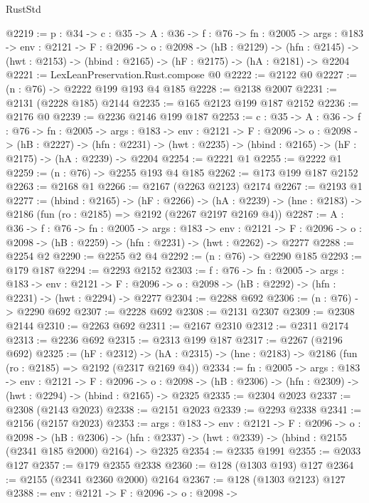 \begin{lexlean}{RustStd}
\begin{coremodule}
{\begin{coremodule}
{{{{@2219 := {p : @34} ->
  {c : @35} ->
  {A : @36} ->
  {f : @76} ->
  {fn : @2005} ->
  {args : @183} ->
  {env : @2121} ->
  {F : @2096} ->
  {o : @2098} ->
  (hB : @2129) ->
  (hfn : @2145) -> (hwt : @2153) -> (hbind : @2165) -> (hF : @2175) -> (hA : @2181) -> @2204
@2221 := LexLeanPreservation.Rust.compose @0
@2222 := @2122 @0
@2227 := (n : @76) -> @2222 @199 @193 @4 @185
@2228 := @2138 @2007
@2231 := @2131 (@2228 @185) @2144
@2235 := @165 @2123 @199 @187 @2152
@2236 := @2176 @0
@2239 := @2236 @2146 @199 @187
@2253 := {c : @35} ->
  {A : @36} ->
  {f : @76} ->
  {fn : @2005} ->
  {args : @183} ->
  {env : @2121} ->
  {F : @2096} ->
  {o : @2098} ->
  (hB : @2227) ->
  (hfn : @2231) -> (hwt : @2235) -> (hbind : @2165) -> (hF : @2175) -> (hA : @2239) -> @2204
@2254 := @2221 @1
@2255 := @2222 @1
@2259 := (n : @76) -> @2255 @193 @4 @185
@2262 := @173 @199 @187 @2152
@2263 := @2168 @1
@2266 := @2167 (@2263 @2123) @2174
@2267 := @2193 @1
@2277 := (hbind : @2165) ->
  (hF : @2266) ->
  (hA : @2239) -> (hne : @2183) -> @2186 (fun (ro : @2185) => @2192 (@2267 @2197 @2169 @4))
@2287 := {A : @36} ->
  {f : @76} ->
  {fn : @2005} ->
  {args : @183} ->
  {env : @2121} ->
  {F : @2096} -> {o : @2098} -> (hB : @2259) -> (hfn : @2231) -> (hwt : @2262) -> @2277
@2288 := @2254 @2
@2290 := @2255 @2 @4
@2292 := (n : @76) -> @2290 @185
@2293 := @179 @187
@2294 := @2293 @2152
@2303 := {f : @76} ->
  {fn : @2005} ->
  {args : @183} ->
  {env : @2121} ->
  {F : @2096} -> {o : @2098} -> (hB : @2292) -> (hfn : @2231) -> (hwt : @2294) -> @2277
@2304 := @2288 @692
@2306 := (n : @76) -> @2290 @692
@2307 := @2228 @692
@2308 := @2131 @2307
@2309 := @2308 @2144
@2310 := @2263 @692
@2311 := @2167 @2310
@2312 := @2311 @2174
@2313 := @2236 @692
@2315 := @2313 @199 @187
@2317 := @2267 (@2196 @692)
@2325 := (hF : @2312) ->
  (hA : @2315) -> (hne : @2183) -> @2186 (fun (ro : @2185) => @2192 (@2317 @2169 @4))
@2334 := {fn : @2005} ->
  {args : @183} ->
  {env : @2121} ->
  {F : @2096} ->
  {o : @2098} -> (hB : @2306) -> (hfn : @2309) -> (hwt : @2294) -> (hbind : @2165) -> @2325
@2335 := @2304 @2023
@2337 := @2308 (@2143 @2023)
@2338 := @2151 @2023
@2339 := @2293 @2338
@2341 := @2156 (@2157 @2023)
@2353 := {args : @183} ->
  {env : @2121} ->
  {F : @2096} ->
  {o : @2098} ->
  (hB : @2306) ->
  (hfn : @2337) -> (hwt : @2339) -> (hbind : @2155 (@2341 @185 @2000) @2164) -> @2325
@2354 := @2335 @1991
@2355 := @2033 @127
@2357 := @179 @2355 @2338
@2360 := @128 (@1303 @193) @127
@2364 := @2155 (@2341 @2360 @2000) @2164
@2367 := @128 (@1303 @2123) @127
@2388 := {env : @2121} ->
  {F : @2096} ->
  {o : @2098} ->
}}}}
\end{coremodule}}
\end{coremodule}
\end{lexlean}
